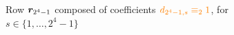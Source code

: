 
\begin{figure}[p]

    \noindent{}

    \captionsetup{singlelinecheck=off}
    \caption[Row $\vect{r}_{2^{4}-1}$ of $\mathcal{C}_{\equiv_{2}}$]{
        Row $\vect{r}_{2^{4}-1}$ composed of coefficients $\textcolor{orange}{d_{2^{4}-1,s} \equiv_{2} 1}$, 
        for $s\in\lbrace1,\ldots,2^{4}-1 \rbrace$ }

    \label{fig:catalan-odd-row}

\end{figure}
